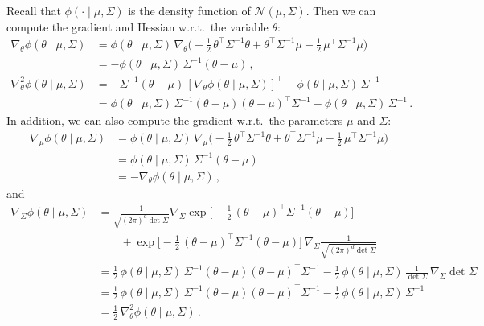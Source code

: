 \documentclass{custom}
\begin{document}
Recall that $\phi(\cdot\mid \mu,\Sigma)$ is the density function of $\mathcal{N}(\mu,\Sigma)$.
Then we can compute the gradient and Hessian w.r.t.~the variable
$ \theta $:
\begin{align}
\nabla_{ \theta }\phi( \theta  \mid \mu,\Sigma)
& =\phi( \theta  \mid \mu,\Sigma)\,\nabla_{ \theta }\bigl(-\frac{1}{2}\, \theta ^{\top}\Sigma^{-1} \theta + \theta ^{\top}\Sigma^{-1}\mu-\frac{1}{2}\,\mu^{\top}\Sigma^{-1}\mu\bigr)\nonumber \\
 & =-\phi( \theta  \mid \mu,\Sigma)\,\Sigma^{-1}( \theta -\mu)\,,\label{eq:gaussian-eq-0}\\
\nabla_{ \theta }^{2}\phi( \theta  \mid \mu,\Sigma)
& =-\Sigma^{-1}( \theta -\mu)\,[\nabla_{ \theta }\phi( \theta  \mid \mu,\Sigma)]^{\top}-\phi( \theta  \mid \mu,\Sigma)\,\Sigma^{-1}\nonumber \\
 & =\phi( \theta  \mid \mu,\Sigma)\,\Sigma^{-1}( \theta -\mu)( \theta -\mu)^{\top}\Sigma^{-1}-\phi( \theta  \mid \mu,\Sigma)\,\Sigma^{-1}\,.\nonumber 
\end{align}
In addition, we can also compute the gradient w.r.t.~the parameters
$\mu$ and $\Sigma$:
\begin{align}
\nabla_{\mu}\phi( \theta  \mid \mu,\Sigma) & =\phi( \theta  \mid \mu,\Sigma)\,\nabla_{\mu}\bigl(-\frac{1}{2}\, \theta ^{\top}\Sigma^{-1} \theta + \theta ^{\top}\Sigma^{-1}\mu-\frac{1}{2}\,\mu^{\top}\Sigma^{-1}\mu\bigr)\nonumber \\
 & =\phi( \theta  \mid \mu,\Sigma)\,\Sigma^{-1}( \theta -\mu)\nonumber \\
 & =-\nabla_{ \theta }\phi( \theta  \mid \mu,\Sigma)\,,\label{eq:gaussian-eq-1}
\end{align}
and
\begin{align}
\nabla_{\Sigma}\phi( \theta  \mid \mu,\Sigma)
& =\frac{1}{\sqrt{(2\pi)^{d}\det \Sigma}}\nabla_{\Sigma}\exp\bigl[-\frac{1}{2}\,( \theta -\mu)^{\top}\Sigma^{-1}( \theta -\mu)\bigr]\nonumber \\
 & \qquad{} +\exp\bigl[-\frac{1}{2}\,( \theta -\mu)^{\top}\Sigma^{-1}( \theta -\mu)\bigr]\,\nabla_{\Sigma}\frac{1}{\sqrt{(2\pi)^{d}\det \Sigma}}\nonumber \\
 & =\frac{1}{2}\,\phi( \theta  \mid \mu,\Sigma)\,\Sigma^{-1}( \theta -\mu)( \theta -\mu)^{\top}\Sigma^{-1}-\frac{1}{2}\,\phi( \theta  \mid \mu,\Sigma)\,\frac{1}{\det \Sigma}\,\nabla_{\Sigma}\det \Sigma\nonumber \\
 & =\frac{1}{2}\,\phi( \theta  \mid \mu,\Sigma)\,\Sigma^{-1}( \theta -\mu)( \theta -\mu)^{\top}\Sigma^{-1}-\frac{1}{2}\,\phi( \theta  \mid \mu,\Sigma)\,\Sigma^{-1}\nonumber \\
 & =\frac{1}{2}\,\nabla_{ \theta }^{2}\phi( \theta  \mid \mu,\Sigma)\,.\label{eq:gaussian-eq-2}
\end{align}
\end{document}
